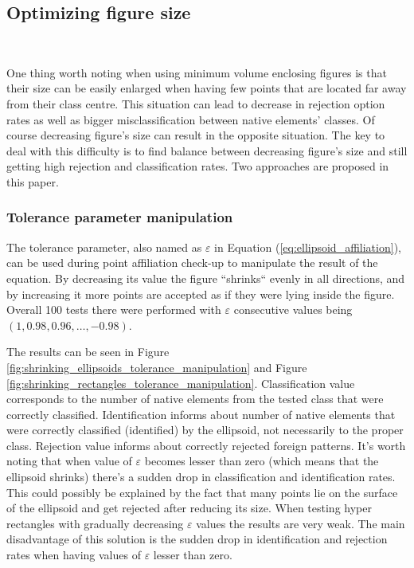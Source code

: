 \subsection{Optimizing figure size} \ \label{size_optimizing}

One thing worth noting when using minimum volume enclosing figures is that their size can be easily enlarged when having few points that are located far away from their class centre. This situation can lead to decrease in rejection option rates as well as bigger misclassification between native elements' classes. Of course decreasing figure's size can result in the opposite situation. The key to deal with this difficulty is to find balance between decreasing figure's size and still getting high rejection and classification rates. Two approaches are proposed in this paper.

\subsubsection{Tolerance parameter manipulation}

The tolerance parameter, also named as $\varepsilon$ in Equation (\ref{eq:ellipsoid_affiliation}), can be used during point affiliation check-up to manipulate the result of the equation. By decreasing its value the figure ``shrinks`` evenly in all directions, and by increasing it more points are accepted as if they were lying inside the figure. Overall 100 tests there were performed with $\varepsilon$ consecutive values being~$(1, 0.98, 0.96, \dots, -0.98)$. 

The results can be seen in Figure \ref{fig:shrinking_ellipsoids_tolerance_manipulation} and Figure \ref{fig:shrinking_rectangles_tolerance_manipulation}. Classification value corresponds to the number of native elements from the tested class that were correctly classified. Identification informs about number of native elements that were correctly classified (identified) by the ellipsoid, not necessarily to the proper class. Rejection value informs about correctly rejected foreign patterns. It's worth noting that when value of $\varepsilon$ becomes lesser than zero (which means that the ellipsoid shrinks) there's a sudden drop in classification and identification rates. This could possibly be explained by the fact that many points lie on the surface of the ellipsoid and get rejected after reducing its size. When testing hyper rectangles with gradually decreasing $\varepsilon$ values the results are very weak. The main disadvantage of this solution is the sudden drop in identification and rejection rates when having values of $\varepsilon$ lesser than zero.

